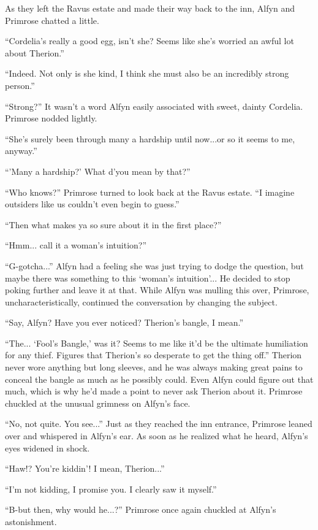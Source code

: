 As they left the Ravus estate and made their way back to the inn, Alfyn and Primrose chatted a little.

``Cordelia's really a good egg, isn't she? Seems like she's worried an awful lot about Therion.''

``Indeed. Not only is she kind, I think she must also be an incredibly strong person.''

``Strong?'' It wasn't a word Alfyn easily associated with sweet, dainty Cordelia. Primrose nodded lightly.

``She's surely been through many a hardship until now...or so it seems to me, anyway.''

``'Many a hardship?' What d'you mean by that?''

``Who knows?'' Primrose turned to look back at the Ravus estate. ``I imagine outsiders like us couldn't even begin to guess.''

``Then what makes ya so sure about it in the first place?''

``Hmm... call it a woman's intuition?''

``G-gotcha...'' Alfyn had a feeling she was just trying to dodge the question, but maybe there was something to this `woman's intuition'... He decided to stop poking further and leave it at that. While Alfyn was mulling this over, Primrose, uncharacteristically, continued the conversation by changing the subject.

``Say, Alfyn? Have you ever noticed? Therion's bangle, I mean.''

``The... `Fool's Bangle,' was it? Seems to me like it'd be the ultimate humiliation for any thief. Figures that Therion's so desperate to get the thing off.'' Therion never wore anything but long sleeves, and he was always making great pains to conceal the bangle as much as he possibly could. Even Alfyn could figure out that much, which is why he'd made a point to never ask Therion about it. Primrose chuckled at the unusual grimness on Alfyn's face.

``No, not quite. You see...'' Just as they reached the inn entrance, Primrose leaned over and whispered in Alfyn's ear. As soon as he realized what he heard, Alfyn's eyes widened in shock.

``Haw!? You're kiddin'! I mean, Therion...''

``I'm not kidding, I promise you. I clearly saw it myself.''

``B-but then, why would he...?'' Primrose once again chuckled at Alfyn's astonishment.

